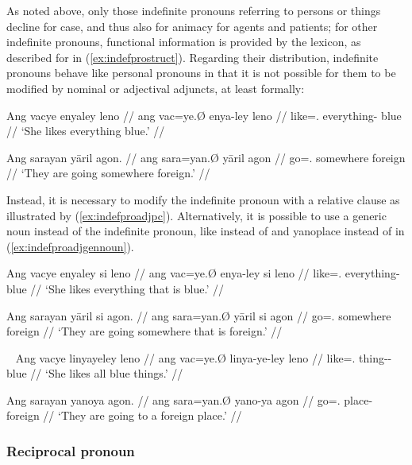 As noted above, only those indefinite pronouns referring to persons or things
decline for case, and thus also for animacy for agents and patients; for other
indefinite pronouns, functional information is provided by the lexicon, as
described for  in (\ref{ex:indefprostruct}). Regarding their
distribution, indefinite pronouns behave like personal pronouns in that it is
not possible for them to be modified by nominal or adjectival adjuncts, at
least formally:

\pex\label{ex:indefproadj}
\a\ljudge*\begingl
	\gla Ang vacye enyaley leno //
	\glb ang vac=ye.Ø enya-ley leno //
	\glc \AgtT{} like=\TsgF{}.\Top{} everything-\PargI{} blue //
	\glft `She likes everything blue.' //
\endgl

\a\ljudge*\begingl
	\gla Ang sarayan yāril agon. //
	\glb ang sara=yan.Ø yāril agon //
	\glc \AgtT{} go=\TplM{}.\Top{} somewhere foreign //
	\glft `They are going somewhere foreign.' //
\endgl
\xe

Instead, it is necessary to modify the indefinite pronoun with a relative
clause as illustrated by (\ref{ex:indefproadjpc}). Alternatively, it is
possible to use a generic noun instead of the indefinite pronoun, like
 instead of  and 
{yano}{place} instead of  in
(\ref{ex:indefproadjgennoun}).

\pex\label{ex:indefproadjpc}
\a\begingl
	\gla Ang vacye enyaley si leno //
	\glb ang vac=ye.Ø enya-ley si leno //
	\glc \AgtT{} like=\TsgF{}.\Top{} everything-\PargI{} \Rel{} blue //
	\glft `She likes everything that is blue.' //
\endgl

\a\begingl
	\gla Ang sarayan yāril si agon. //
	\glb ang sara=yan.Ø yāril si agon //
	\glc \AgtT{} go=\TplM{}.\Top{} somewhere \Rel{} foreign //
	\glft `They are going somewhere that is foreign.' //
\endgl
\xe

\pex~\label{ex:indefproadjgennoun}
\a\begingl
	\gla Ang vacye linyayeley leno //
	\glb ang vac=ye.Ø linya-ye-ley leno //
	\glc \AgtT{} like=\TsgF{}.\Top{} thing-\Pl{}-\PargI{} blue //
	\glft `She likes all blue things.' //
\endgl

\a\begingl
	\gla Ang sarayan yanoya agon. //
	\glb ang sara=yan.Ø yano-ya agon //
	\glc \AgtT{} go=\TplM{}.\Top{} place-\Loc{} foreign //
	\glft `They are going to a foreign place.' //
\endgl
\xe

\subsubsection{Reciprocal pronoun}

